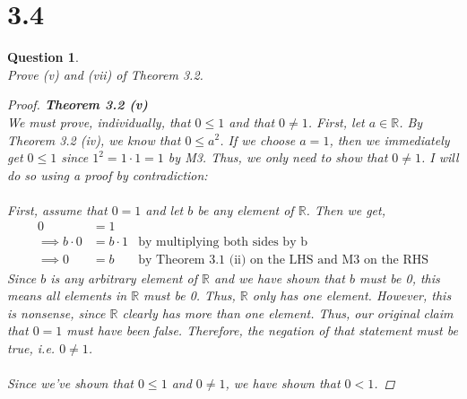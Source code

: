 \documentclass[10pt,a4paper]{article}
\newtheorem*{question*}{Question}
\theoremstyle{definition}
\begin{document}
\section*{3.4}
\begin{question*}{$ $}
\\Prove (v) and (vii) of Theorem 3.2.

\begin{proof}{\textbf{Theorem 3.2 (v)}}
\\We must prove, individually, that $0 \leq 1$ and that $0 \neq 1$. First, let $a \in \mathbb{R}$. By Theorem 3.2 (iv), we know that $0 \leq a^2$. If we choose $a = 1$, then we immediately get $0 \leq 1$ since $1^2 = 1 \cdot 1 = 1$ by M3. Thus, we only need to show that $0 \neq 1$. I will do so using a proof by contradiction:
\\
\\First, assume that $0 = 1$ and let $b$ be any element of $\mathbb{R}$. Then we get,
\begin{align*}
0 &= 1\\
\implies b \cdot 0 &= b \cdot 1 &\text{by multiplying both sides by b}\\
\implies 0 &= b &\text{by Theorem 3.1 (ii) on the LHS and M3 on the RHS}
\end{align*}
Since $b$ is any arbitrary element of $\mathbb{R}$ and we have shown that $b$ must be 0, this means all elements in $\mathbb{R}$ must be 0. Thus, $\mathbb{R}$ only has one element. However, this is nonsense, since $\mathbb{R}$ clearly has more than one element. Thus, our original claim that $0 = 1$ must have been false. Therefore, the negation of that statement must be true, i.e. $0 \neq 1$. 
\\
\\Since we've shown that $0 \leq 1$ and $0 \neq 1$, we have shown that $0 < 1$. 
\end{proof}


\end{question*}
\end{document}

